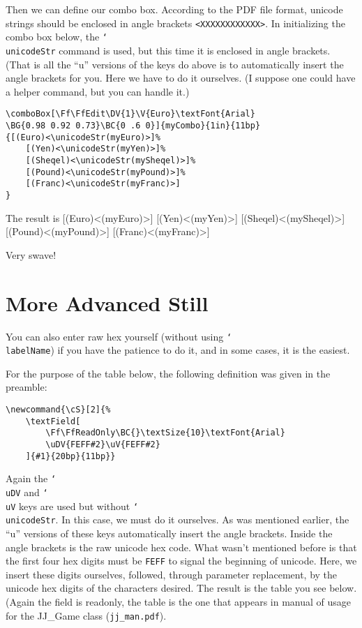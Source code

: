 \documentclass{article}
\newcommand{\cs}[1]{\texttt{\char`\\#1}}
\newcommand{\cS}[2]{\textField[\Ff\FfReadOnly\textSize{10}\textFont{Arial}\uDV{FEFF#2}\uV{FEFF#2}\BC{}]{#1}{20bp}{11bp}}
\begin{document}

Then we can define our combo box.  According to the PDF file format,
unicode strings should be enclosed in angle brackets
\verb!<XXXXXXXXXXXX>!. In initializing the combo box below, the
\cs{unicodeStr} command is used, but this time it is enclosed in
angle brackets. (That is all the ``u'' versions of the keys do above
is to automatically insert the angle brackets for you. Here we have
to do it ourselves. (I suppose one could have a helper command, but
you can handle it.)
\begin{verbatim}
\comboBox[\Ff\FfEdit\DV{1}\V{Euro}\textFont{Arial}
\BG{0.98 0.92 0.73}\BC{0 .6 0}]{myCombo}{1in}{11bp}
{[(Euro)<\unicodeStr(myEuro)>]%
    [(Yen)<\unicodeStr(myYen)>]%
    [(Sheqel)<\unicodeStr(mySheqel)>]%
    [(Pound)<\unicodeStr(myPound)>]%
    [(Franc)<\unicodeStr(myFranc)>]
}
\end{verbatim}
The result is
{[(Euro)<\unicodeStr(myEuro)>]%
    [(Yen)<\unicodeStr(myYen)>]%
    [(Sheqel)<\unicodeStr(mySheqel)>]%
    [(Pound)<\unicodeStr(myPound)>]%
    [(Franc)<\unicodeStr(myFranc)>]
}

Very swave!

\section{More Advanced Still}

You can also enter raw hex yourself (without using \cs{labelName}) if you have the patience to do
it, and  in some cases, it is the easiest.

For the purpose of the table below, the following definition was given in the preamble:

\begin{verbatim}
\newcommand{\cS}[2]{%
    \textField[
        \Ff\FfReadOnly\BC{}\textSize{10}\textFont{Arial}
        \uDV{FEFF#2}\uV{FEFF#2}
    ]{#1}{20bp}{11bp}}
\end{verbatim}
Again the \cs{uDV} and \cs{uV} keys are used but without
\cs{unicodeStr}. In this case, we must do it ourselves. As was
mentioned earlier, the ``u'' versions of these keys automatically
insert the angle brackets. Inside the angle brackets is the raw
unicode hex code. What wasn't mentioned before is that the first
four hex digits must be \texttt{FEFF} to signal the beginning of
unicode. Here, we insert these digits ourselves, followed, through
parameter replacement, by the unicode hex digits of the characters
desired. The result is the table you see below. (Again the field is
readonly, the table is the one that appears in manual of usage for the
JJ\_Game class (\texttt{jj\_man.pdf}).
\end{document}
